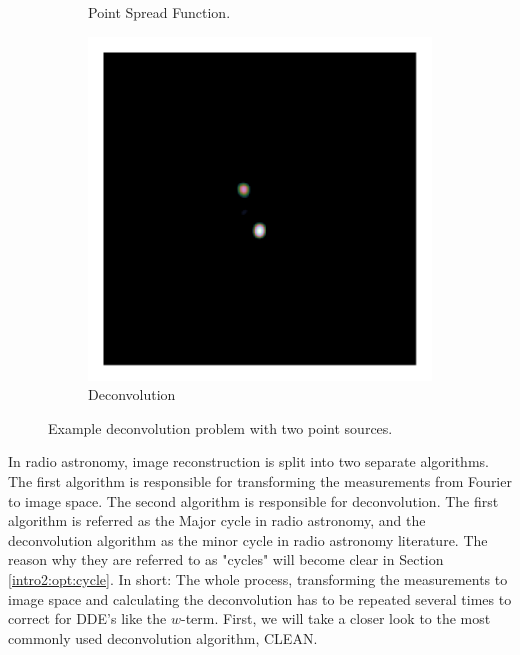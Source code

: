 \begin{figure}[h]
\begin{subfigure}[b]{0.3\linewidth}
		\caption{Point Spread Function.}
		\label{radio:alg:psf}
	\end{subfigure}
	\begin{subfigure}[b]{0.3\linewidth}
		\includegraphics[width=\linewidth, clip, trim= 0.25in 0.25in 0.25in 0.25in]{./chapters/03.cd/simulated/elasticNet.png}
		\caption{Deconvolution}
		\label{radio:alg:elastic}
	\end{subfigure}

	\caption{Example deconvolution problem with two point sources.}
	\label{radio:alg:figure}
\end{figure}

In radio astronomy, image reconstruction is split into two separate algorithms. The first algorithm is responsible for transforming the measurements from Fourier to image space. The second algorithm is responsible for deconvolution. The first algorithm is referred as the Major cycle in radio astronomy, and the deconvolution algorithm as the minor cycle in radio astronomy literature. The reason why they are referred to as "cycles" will become clear in Section \ref{intro2:opt:cycle}. In short: The whole process, transforming the measurements to image space and calculating the deconvolution has to be repeated several times to correct for DDE's like the $w$-term. First, we will take a closer look to the most commonly used deconvolution algorithm, CLEAN.


